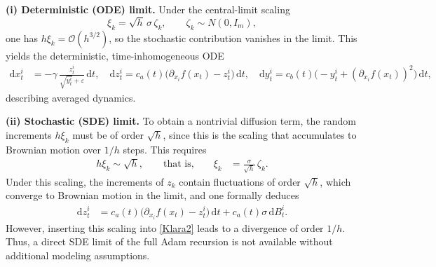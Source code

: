 \documentclass[11pt, a4paper,leqno]{amsart}
\theoremstyle{definition}
\numberwithin{equation}{section}
\begin{document}
\medskip
\noindent
\textbf{(i) Deterministic (ODE) limit.}
Under the central-limit scaling
\[
\xi_k = \sqrt{h}\,\sigma\,\zeta_k, \qquad \zeta_k \sim N(0,I_m),
\]
one has $h\xi_k = \mathcal{O}(h^{3/2})$, so the stochastic contribution vanishes in the limit. This yields the deterministic, time-inhomogeneous ODE
\begin{align} \label{eq:cts-xode}
\mathrm{d}x_t^i &= -\gamma\,\frac{z_t^i}{\sqrt{y_t^i}+\varepsilon}\,\mathrm{d}t,\quad
\mathrm{d}z_t^i = c_a(t)\bigl(\partial_{x_i}f(x_t)-z_t^i\bigr)\,\mathrm{d}t, \quad
\mathrm{d}y_t^i = c_b(t)\bigl(-y_t^i + (\partial_{x_i}f(x_t))^2 \bigr)\,\mathrm{d}t,
\end{align}
describing averaged dynamics.

\medskip
\noindent
\textbf{(ii) Stochastic (SDE) limit.}
To obtain a nontrivial diffusion term, the random increments $h\xi_k$ must be of order $\sqrt{h}$, since this is the scaling that accumulates to Brownian motion over $1/h$ steps. This requires
\begin{align}\label{klara3}
h\xi_k \sim \sqrt{h},
\qquad\text{that is,}\qquad
\xi_k &= \frac{\sigma}{\sqrt{h}}\,\zeta_k.
\end{align}
Under this scaling, the increments of $z_k$ contain fluctuations of order $\sqrt{h}$, which converge to Brownian motion in the limit, and one formally deduces
\begin{align}
\mathrm{d}z_t^i &= c_a(t)\bigl(\partial_{x_i}f(x_t)-z_t^i\bigr)\,\mathrm{d}t
                 + c_a(t)\sigma\,\mathrm{d}B_t^i. \label{eq:cts-zapa}
\end{align}
 However, inserting this scaling into \eqref{Klara2} leads to a divergence of order $1/h$. Thus, a direct SDE limit of the full Adam recursion is not available without additional modeling assumptions.
\end{document}
